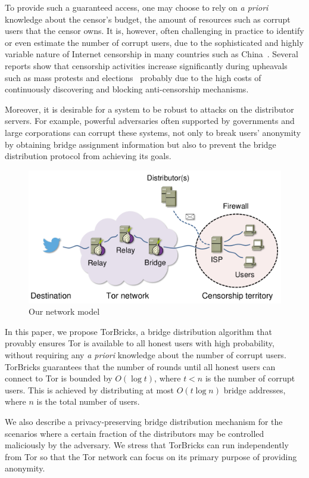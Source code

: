 \documentclass[a4paper,UKenglish]{lipics-v2016}
\newcommand{\bricks}{}
\def\bricks/{\mbox{TorBricks}}
\begin{document}
To provide such a guaranteed access, one may choose to rely on \emph{a priori} knowledge about the censor's budget, the amount of resources such as corrupt users that the censor owns. It is, however, often challenging in practice to identify or even estimate the number of corrupt users, due to the sophisticated and highly variable nature of Internet censorship in many countries such as China~\cite{Oni:2012:China,Ensafi2015b}. Several reports show that censorship activities increase significantly during upheavals such as mass protests and elections~\cite{Dainotti:2011, washingtonpost:2009} probably due to the high costs of continuously discovering and blocking anti-censorship mechanisms.

Moreover, it is desirable for a system to be robust to attacks on the distributor servers. For example, powerful adversaries often supported by governments and large corporations can corrupt these systems, not only to break users' anonymity by obtaining bridge assignment information but also to prevent the bridge distribution protocol from achieving its goals.%

\begin{figure}[t]
	\centering
	\includegraphics[width=0.6\linewidth]{images/model.pdf}
	\caption{Our network model}
	\label{fig:model}
\end{figure}

In this paper, we propose \bricks/, a bridge distribution algorithm that provably ensures Tor is available to all honest users with high probability, without requiring any \emph{a priori} knowledge about the number of corrupt users. \bricks/ guarantees that the number of rounds until all honest users can connect to Tor is bounded by $O(\log{t})$, where ${t<n}$ is the number of corrupt users. This is achieved by distributing at most $O(t\log{n})$ bridge addresses, where $n$ is the total number of users.

We also describe a privacy-preserving bridge distribution mechanism for the scenarios where a certain fraction of the distributors may be controlled maliciously by the adversary. 
We stress that \bricks/ can run independently from Tor so that the Tor network can focus on its primary purpose of providing anonymity.
\end{document}
